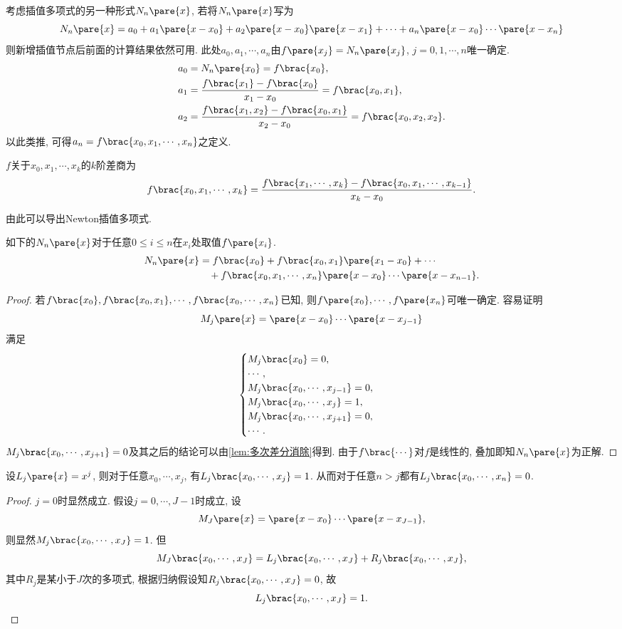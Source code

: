 \documentclass[hidelinks]{ctexart}
\begin{document}
考虑插值多项式的另一种形式$N_n\pare{x}$, 若将$N_n\pare{x}$写为
\[ N_n\pare{x} = a_0 + a_1 \pare{x-x_0} + a_2\pare{x-x_0}\pare{x - x_1} + \cdots + a_n\pare{x-x_0}\cdots\pare{x-x_n} \]
则新增插值节点后前面的计算结果依然可用. 此处$a_0, a_1,\cdots, a_n$由$f\pare{x_j} = N_n\pare{x_j}$, $j=0,1,\cdots,n$唯一确定.
\begin{align*}
    & a_0 = N_n\pare{x_0} = f\brac{x_0}, \\
    & a_1 = \frac{f\brac{x_1} - f\brac{x_0}}{x_1 - x_0} = f\brac{x_0,x_1}, \\
    & a_2 = \frac{f\brac{x_1,x_2} - f\brac{x_0,x_1}}{x_2 - x_0} = f\brac{x_0,x_2,x_2}.
\end{align*}
以此类推, 可得$a_n = f\brac{x_0,x_1,\cdots,x_n}$之定义.
\begin{definition}
    $f$关于$x_0,x_1,\cdots,x_k$的$k$阶差商为
    \[ f\brac{x_0,x_1,\cdots,x_k} = \frac{f\brac{x_1,\cdots,x_k} - f\brac{x_0,x_1,\cdots,x_{k-1}}}{x_k - x_0}. \]
\end{definition}
由此可以导出Newton插值多项式.
\begin{theorem}
    如下的$N_n\pare{x}$对于任意$0\le i \le n$在$x_i$处取值$f\pare{x_i}$.
    \begin{align*}
        N_n\pare{x} &= f\brac{x_0} + f\brac{x_0,x_1}\pare{x_1 - x_0} + \cdots \\
        & \phantom{=\,} + f\brac{x_0,x_1,\cdots,x_n}\pare{x-x_0}\cdots \pare{x-x_{n-1}}. 
    \end{align*}
\end{theorem}
\begin{proof}
    若$f\brac{x_0}, f\brac{x_0,x_1},\cdots, f\brac{x_0,\cdots,x_n}$已知, 则$f\pare{x_0},\cdots,f\pare{x_n}$可唯一确定. 容易证明
    \[ M_j\pare{x} = \pare{x-x_0}\cdots \pare{x-x_{j-1}} \]
    满足
    \[ \begin{cases}
        M_j\brac{x_0} = 0,\\
        \cdots,\\
        M_j\brac{x_0,\cdots,x_{j-1}} = 0,\\
        M_j\brac{x_0,\cdots,x_{j}}  = 1,\\
        M_j\brac{x_0,\cdots,x_{j+1}}  = 0,\\
        \cdots.
    \end{cases} \]
    $M_j\brac{x_0,\cdots,x_{j+1}}  = 0$及其之后的结论可以由\cref{lem:多次差分消除}得到. 由于$f\brac{\cdots}$对$f$是线性的, 叠加即知$N_n\pare{x}$为正解.
\end{proof}
\begin{lemma}
    \label{lem:多次差分消除}
    设$L_j\pare{x} = x^j$, 则对于任意$x_0,\cdots,x_j$, 有$L_j\brac{x_0,\cdots,x_j} = 1$. 从而对于任意$n>j$都有$L_j\brac{x_0,\cdots,x_n} = 0$.
\end{lemma}
\begin{proof}
    $j=0$时显然成立. 假设$j=0,\cdots,J-1$时成立, 设
    \[ M_J\pare{x} = \pare{x-x_0}\cdots \pare{x-x_{J-1}}, \]
    则显然$M_j\brac{x_0,\cdots,x_J} = 1$. 但
    \[ M_J\brac{x_0,\cdots,x_J} = L_j\brac{x_0,\cdots,x_J} + R_j\brac{x_0,\cdots,x_J}, \]
    其中$R_j$是某小于$J$次的多项式, 根据归纳假设知$R_j\brac{x_0,\cdots,x_J} = 0$, 故
    \[ L_j\brac{x_0,\cdots,x_J} = 1. \qedhere \]
\end{proof}
\end{document}

